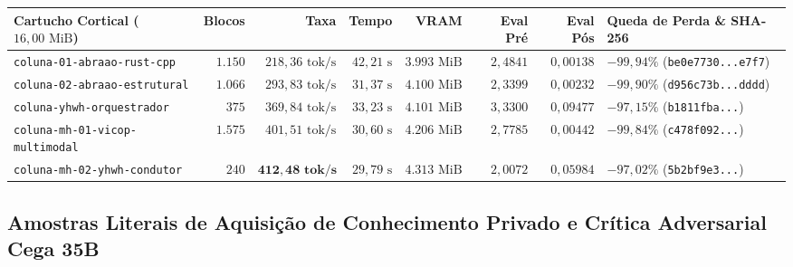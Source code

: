 \documentclass[10pt,a4paper]{article}
\begin{document}
\begin{table}[!htbp]
\vspace{4pt}
\begin{tabularx}{\linewidth}{@{}lrrrrrrY@{}}
\toprule
\textbf{Cartucho Cortical ($16,00\text{ MiB}$)} & \textbf{Blocos} & \textbf{Taxa} & \textbf{Tempo} & \textbf{VRAM} & \textbf{Eval Pr\'e} & \textbf{Eval P\'os} & \textbf{Queda de Perda \& SHA-256} \\
\midrule
\texttt{coluna-01-abraao-rust-cpp} & $1.150$ & $218,36\text{ tok/s}$ & $42,21\text{ s}$ & $3.993\text{ MiB}$ & $2,4841$ & $0,00138$ & $-99,94\%$ (\texttt{be0e7730...e7f7}) \\
\texttt{coluna-02-abraao-estrutural} & $1.066$ & $293,83\text{ tok/s}$ & $31,37\text{ s}$ & $4.100\text{ MiB}$ & $2,3399$ & $0,00232$ & $-99,90\%$ (\texttt{d956c73b...dddd}) \\
\texttt{coluna-yhwh-orquestrador} & $375$ & $369,84\text{ tok/s}$ & $33,23\text{ s}$ & $4.101\text{ MiB}$ & $3,3300$ & $0,09477$ & $-97,15\%$ (\texttt{b1811fba...}) \\
\texttt{coluna-mh-01-vicop-multimodal} & $1.575$ & $401,51\text{ tok/s}$ & $30,60\text{ s}$ & $4.206\text{ MiB}$ & $2,7785$ & $0,00442$ & $-99,84\%$ (\texttt{c478f092...}) \\
\texttt{coluna-mh-02-yhwh-condutor} & $240$ & $\mathbf{412,48\text{ tok/s}}$ & $29,79\text{ s}$ & $4.313\text{ MiB}$ & $2,0072$ & $0,05984$ & $-97,02\%$ (\texttt{5b2bf9e3...}) \\
\bottomrule
\end{tabularx}
\end{table}

\subsection{Amostras Literais de Aquisi\c{c}\~ao de Conhecimento Privado e Cr\'itica Adversarial Cega 35B}
\end{document}
